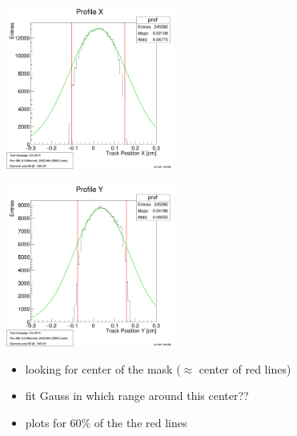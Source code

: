 \documentclass[9pt]{beamer}
\begin{document}
\begin{frame}
	\begin{center}
		\begin{minipage}{5.5cm}
			\centering
			\includegraphics[width=5.5cm]{BeamProfileXFit}
		\end{minipage}
		\hspace*{2pt}
		\begin{minipage}{5.5cm}
			\centering
			\includegraphics[width=5.5cm]{BeamProfileYFit}
		\end{minipage}\no\s
	\end{center}
	\begin{itemize}
		\item looking for center of the mask ($\approx$ center of red lines)
		\item fit Gauss in which range around this center?? 
		\item plots for 60\% of the the red lines 
	\end{itemize}

\end{frame}
\end{document}
